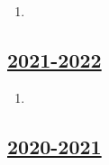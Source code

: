 \begin{enumerate}

\item 


\end{enumerate}
    


\subsection[2021-2022]{\hyperref[sec:kr_04_2021_2022]{2021-2022}}
\label{sec:sol_kr_04_2021_2022} %



\begin{enumerate}

\item 


\end{enumerate}
    

\subsection[2020-2021]{\hyperref[sec:kr_04_2020_2021]{2020-2021}}
\label{sec:sol_kr_04_2020_2021} %


